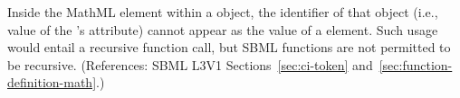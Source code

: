 Inside the  MathML element within a \FunctionDefinition
object, the identifier of that object (i.e., value of the
\FunctionDefinition's  attribute) cannot appear as the value of a
 element.  Such usage would entail a recursive function call, but
SBML functions are not permitted to be recursive.  (References: SBML L3V1
Sections~\ref{sec:ci-token} and~\ref{sec:function-definition-math}.)

